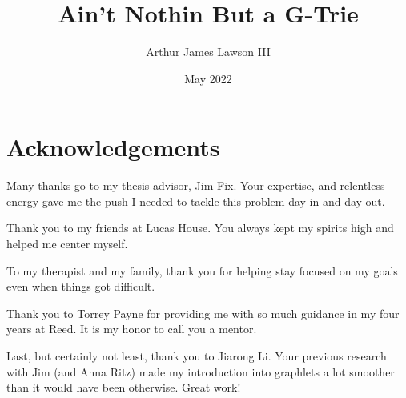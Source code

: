 \documentclass[12pt,twoside]{reedthesis}
\title{Ain't Nothin But a G-Trie}
\author{Arthur James Lawson III}
\date{May 2022}
\begin{document}
  \maketitle
  \frontmatter %
  \pagestyle{empty} %

    \chapter*{Acknowledgements}
	Many thanks go to my thesis advisor, Jim Fix. Your expertise, and relentless energy gave me the push I needed to tackle this problem day in and day out.
	
	Thank you to my friends at Lucas House. You always kept my spirits high and helped me center myself.
	
	To my therapist and my family, thank you for helping stay focused on my goals even when things got difficult.
	
	Thank you to Torrey Payne for providing me with so much guidance in my four years at Reed. It is my honor to call you a mentor.
	
	Last, but certainly not least, thank you to Jiarong Li. Your previous research with Jim (and Anna Ritz) made my introduction into graphlets a lot smoother than it would have been otherwise. Great work!
	

	
	


	
\end{document}
